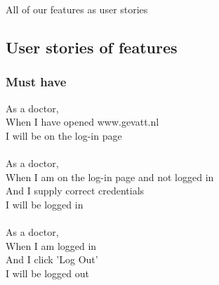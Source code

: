 All of our features as user stories
\subsection{User stories of features}
	\subsubsection*{Must have}
		As a doctor,\\
		When I have opened www.gevatt.nl\\
		I will be on the log-in page\\
		\\	
		As a doctor,\\
		When I am on the log-in page and not logged in\\
		And I supply correct credentials\\
		I will be logged in\\
		\\	
		As a doctor,\\
		When I am logged in\\
		And I click 'Log Out'\\
		I will be logged out\\
	
